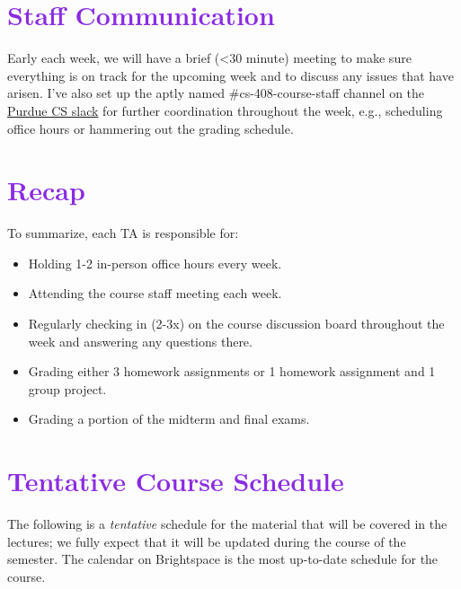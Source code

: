 \documentclass[letterpaper,11pt]{article}
\begin{document}
\section*{\textcolor{BlueViolet}{Staff Communication}}

Early each week, we will have a brief (<30 minute) meeting to make
sure everything is on track for the upcoming week and to discuss any
issues that have arisen. I've also set up the aptly named
\#cs-408-course-staff channel on the
\href{csboilermakers.slack.com}{Purdue CS slack} for further
coordination throughout the week, e.g., scheduling office hours or
hammering out the grading schedule.

\section*{\textcolor{BlueViolet}{Recap}}

To summarize, each TA is responsible for:
\begin{itemize}
\item Holding 1-2 in-person office hours every week.
\item Attending the course staff meeting each week.
\item Regularly checking in (2-3x) on the course discussion board
  throughout the week and answering any questions there.
\item Grading either 3 homework assignments or 1 homework assignment
  and 1 group project.
\item Grading a portion of the midterm and final exams.
\end{itemize}
%
%

\section*{\textcolor{BlueViolet}{Tentative Course Schedule}}

The following is a \textit{tentative} schedule for the material that
will be covered in the lectures; we fully expect that it will be
updated during the course of the semester. The calendar on Brightspace
is the most up-to-date schedule for the course.
\end{document}
